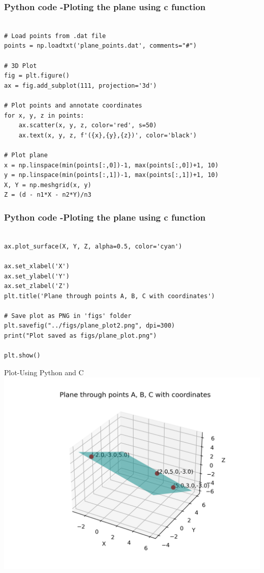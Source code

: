 \documentclass{beamer}
\begin{document}
	
\begin{frame}[fragile]                              
	\frametitle{Python code -Ploting the plane using c function} 
	\begin{lstlisting}

# Load points from .dat file
points = np.loadtxt('plane_points.dat', comments="#")

# 3D Plot
fig = plt.figure()
ax = fig.add_subplot(111, projection='3d')

# Plot points and annotate coordinates
for x, y, z in points:
    ax.scatter(x, y, z, color='red', s=50)
    ax.text(x, y, z, f'({x},{y},{z})', color='black')

# Plot plane
x = np.linspace(min(points[:,0])-1, max(points[:,0])+1, 10)
y = np.linspace(min(points[:,1])-1, max(points[:,1])+1, 10)
X, Y = np.meshgrid(x, y)
Z = (d - n1*X - n2*Y)/n3
\end{lstlisting}
\end{frame}

	
\begin{frame}[fragile]                              
	\frametitle{Python code -Ploting the plane using c function} 
	\begin{lstlisting}

ax.plot_surface(X, Y, Z, alpha=0.5, color='cyan')

ax.set_xlabel('X')
ax.set_ylabel('Y')
ax.set_zlabel('Z')
plt.title('Plane through points A, B, C with coordinates')

# Save plot as PNG in 'figs' folder
plt.savefig("../figs/plane_plot2.png", dpi=300)
print("Plot saved as figs/plane_plot.png")

plt.show()

\end{lstlisting}                               
\end{frame}

\begin{frame}{Plot-Using  Python and C}
    \centering
    \includegraphics[width=\columnwidth, height=0.8\textheight, keepaspectratio]{../figs/plane_plot2.png}     
\end{frame}

	
\end{document}
